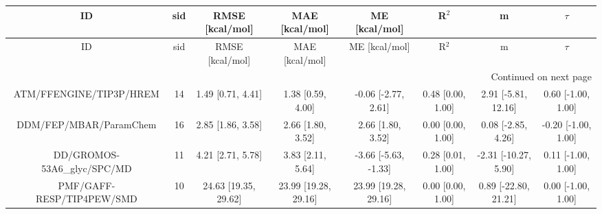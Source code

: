 \documentclass[8pt]{article}
\begin{document}
\begin{center}
\begin{footnotesize}
\begin{longtable}{|cccccccc|}
\toprule
                         ID & sid &      RMSE [kcal/mol] &       MAE [kcal/mol] &        ME [kcal/mol] &             R$^2$ &                    m &              $\tau$ \\
\midrule
\endfirsthead

\toprule
                         ID & sid &      RMSE [kcal/mol] &       MAE [kcal/mol] &        ME [kcal/mol] &             R$^2$ &                    m &              $\tau$ \\
\midrule
\endhead
\midrule
\multicolumn{8}{r}{{Continued on next page}} \\
\midrule
\endfoot

\bottomrule
\endlastfoot
    ATM/FFENGINE/TIP3P/HREM &  14 &    1.49 [0.71, 4.41] &    1.38 [0.59, 4.00] &  -0.06 [-2.77, 2.61] & 0.48 [0.00, 1.00] &  2.91 [-5.81, 12.16] &  0.60 [-1.00, 1.00] \\
     DDM/FEP/MBAR/ParamChem &  16 &    2.85 [1.86, 3.58] &    2.66 [1.80, 3.52] &    2.66 [1.80, 3.52] & 0.00 [0.00, 1.00] &   0.08 [-2.85, 4.26] & -0.20 [-1.00, 1.00] \\
DD/GROMOS-53A6\_glyc/SPC/MD &  11 &    4.21 [2.71, 5.78] &    3.83 [2.11, 5.64] & -3.66 [-5.63, -1.33] & 0.28 [0.01, 1.00] & -2.31 [-10.27, 5.90] &  0.11 [-1.00, 1.00] \\
  PMF/GAFF-RESP/TIP4PEW/SMD &  10 & 24.63 [19.35, 29.62] & 23.99 [19.28, 29.16] & 23.99 [19.28, 29.16] & 0.00 [0.00, 1.00] & 0.89 [-22.80, 21.21] &  0.00 [-1.00, 1.00] \\
\end{longtable}
\end{footnotesize}
\end{center}
\end{document}
